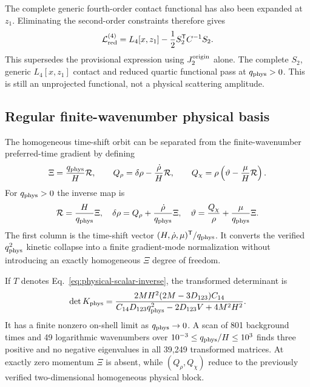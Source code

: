 The complete generic fourth-order contact functional has also been expanded
at $z_1$.  Eliminating the second-order constraints therefore gives
\begin{equation}
 \mathcal L_{\rm red}^{(4)}
 =L_4[x,z_1]-\frac12S_2^{\mathsf T}C^{-1}S_2 .
 \label{eq:complete-s2-schur}
\end{equation}
This supersedes the provisional expression using $J_2^{\rm origin}$ alone.
The complete $S_2$, generic $L_4[x,z_1]$ contact and reduced quartic
functional pass at $q_{\rm phys}>0$.  This is still an unprojected functional,
not a physical scattering amplitude.

\subsection{Regular finite-wavenumber physical basis}

The homogeneous time-shift orbit can be separated from the finite-wavenumber
preferred-time gradient by defining
\begin{equation}
 \Xi=\frac{q_{\rm phys}}{H}\mathcal R,\qquad
 Q_\rho=\delta\rho-\frac{\dot\rho}{H}\mathcal R,\qquad
 Q_\chi=\rho\left(\vartheta-\frac{\mu}{H}\mathcal R\right).
 \label{eq:physical-scalar-basis}
\end{equation}
For $q_{\rm phys}>0$ the inverse map is
\begin{equation}
 \mathcal R=\frac{H}{q_{\rm phys}}\Xi,\quad
 \delta\rho=Q_\rho+\frac{\dot\rho}{q_{\rm phys}}\Xi,\quad
 \vartheta=\frac{Q_\chi}{\rho}+\frac{\mu}{q_{\rm phys}}\Xi .
 \label{eq:physical-scalar-inverse}
\end{equation}
The first column is the time-shift vector
$(H,\dot\rho,\mu)^{\mathsf T}/q_{\rm phys}$.  It converts the verified
$q_{\rm phys}^2$ kinetic collapse into a finite gradient-mode normalization
without introducing an exactly homogeneous $\Xi$ degree of freedom.

If $T$ denotes Eq.~\eqref{eq:physical-scalar-inverse}, the transformed
determinant is
\begin{equation}
 \det K_{\rm phys}
 =\frac{2MH^2(2M-3D_{123})C_{14}}
 {C_{14}D_{123}q_{\rm phys}^2-2D_{123}V+4M^2H^2}.
 \label{eq:physical-scalar-determinant}
\end{equation}
It has a finite nonzero on-shell limit as $q_{\rm phys}\to0$.  A scan of
801 background times and 49 logarithmic wavenumbers over
$10^{-3}\le q_{\rm phys}/H\le10^3$ finds three positive and no negative
eigenvalues in all 39,249 transformed matrices.  At exactly zero momentum
$\Xi$ is absent, while $(Q_\rho,Q_\chi)$ reduce to the previously verified
two-dimensional homogeneous physical block.

